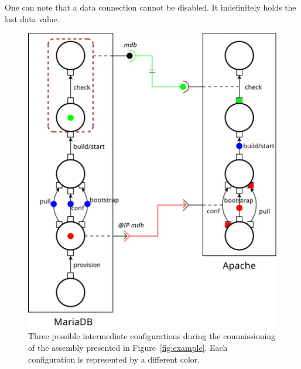 One can note that a data connection cannot be disabled. It
indefinitely holds the last data value.

\begin{figure}[tbp]
  \begin{center}
    \includegraphics[width=0.7\linewidth]{./images/scenari.pdf}
  \end{center}
  \caption{Three possible intermediate configurations during the commissioning
  of the assembly presented in Figure~\ref{fig:example}. Each configuration is
  represented by a different color.}
  \label{fig:scenari}
\end{figure}

